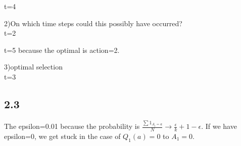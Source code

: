 \documentclass[answers]{exam}
\theoremstyle{definition}
\theoremstyle{remark}
\begin{document}
t=4


2)On which time steps could this possibly have occurred?\\
t=2

t=5
because the optimal is action=2.

3)optimal selection\\

t=3 



\subsection{2.3}
The epsilon=0.01 because the probability is $\frac{\sum 1_{A_{i}=a}}{N}\to \frac{\epsilon}{k}+1-\epsilon$. If we have epsilon=0, we get stuck in the case of $Q_1(a)=0$ to $A_{1}=0$.
\end{document}
